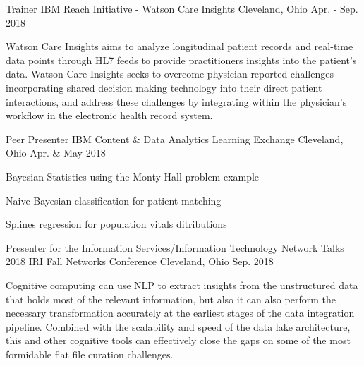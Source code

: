 

\begin{cventries}

  \cventry
    {Trainer} %
    {IBM Reach Initiative - Watson Care Insights} %
    {Cleveland, Ohio} %
    {Apr. - Sep. 2018} %
    {
      \begin{cvitems} %
        \item {Watson Care Insights aims to analyze longitudinal patient records and real-time data points through HL7 feeds to provide practitioners insights into the patient’s data.  Watson Care Insights seeks to overcome physician-reported challenges incorporating shared decision making technology into their direct patient interactions, and address these challenges by integrating within the physician's workflow in the electronic health record system.}
      \end{cvitems}
    }

  \cventry
    {Peer Presenter} %
    {IBM Content \& Data Analytics Learning Exchange} %
    {Cleveland, Ohio} %
    {Apr. \& May 2018} %
    {
      \begin{cvitems} %
        \item {Bayesian Statistics using the Monty Hall problem example}
        \item {Naive Bayesian classification for patient matching}
        \item {Splines regression for population vitals ditributions}
      \end{cvitems}
    }

  \cventry
    {Presenter for the Information Services/Information Technology Network Talks} %
    {2018 IRI Fall Networks Conference} %
    {Cleveland, Ohio} %
    {Sep. 2018} %
    {
      \begin{cvitems} %
        \item {Cognitive computing can use NLP to extract insights from the unstructured data that holds most of the relevant information, but also it can also perform the necessary transformation accurately at the earliest stages of the data integration pipeline.  Combined with the scalability and speed of the data lake architecture, this and other cognitive tools can effectively close the gaps on some of the most formidable flat file curation challenges.}
      \end{cvitems}
    }


\end{cventries}
